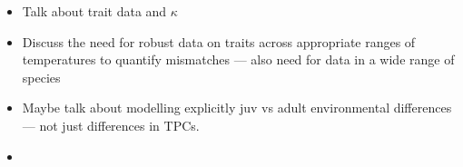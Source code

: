 \begin{itemize}
\item Talk about trait data and $\kappa$
\item Discuss the need for robust data on traits across appropriate ranges of temperatures to quantify mismatches --- also need for data in a wide range of species 
\item Maybe talk about modelling explicitly juv vs adult environmental differences --- not just differences in TPCs.    
\item {}
\end{itemize}

 


\pagebreak

 

